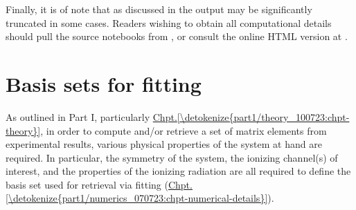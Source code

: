 \documentclass[letterpaper,table,10pt,english]{jupyterBook}
\begin{document}
\sphinxAtStartPar
{}

\sphinxAtStartPar
Finally, it is of note that \sphinxhyphen{} as discussed in the {\hyperref[\detokenize{frontmatter/book_versions_note:chpt-book-versions}]{}} \sphinxhyphen{} output may be significantly truncated in some cases. Readers wishing to obtain all computational details should pull the source notebooks from , or consult the online HTML version at .

\sphinxstepscope


\chapter{Basis sets for fitting}
\label{\detokenize{part2/sym-fitting-intro_240723:basis-sets-for-fitting}}\label{\detokenize{part2/sym-fitting-intro_240723:sect-basis-sets-fitting-intro}}\label{\detokenize{part2/sym-fitting-intro_240723::doc}}
\sphinxAtStartPar
As outlined in Part I, particularly \hyperref[\detokenize{part1/theory_100723:chpt-theory}]{Chpt.\@ \ref{\detokenize{part1/theory_100723:chpt-theory}}}, in order to compute and/or retrieve a set of matrix elements from experimental results, various physical properties of the system at hand are required. In particular, the symmetry of the system, the ionizing channel(s) of interest, and the properties of the ionizing radiation are all required to define the basis set used for {\hyperref[\detokenize{backmatter/glossary:term-radial-matrix-elements}]{}} retrieval via fitting (\hyperref[\detokenize{part1/numerics_070723:chpt-numerical-details}]{Chpt.\@ \ref{\detokenize{part1/numerics_070723:chpt-numerical-details}}}).
\end{document}
